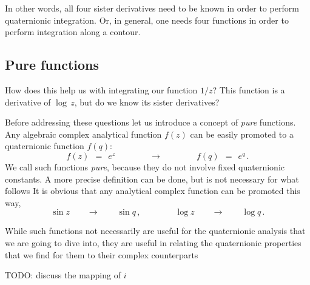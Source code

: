 \documentclass[epsfig,12pt]{article}
\begin{document}
	In other words, all four sister derivatives need to be known in order to perform quaternionic integration.
	Or, in general, one needs four functions in order to perform integration along a contour.


\subsection{Pure functions}

	How does this help us with integrating our function $ 1 / z $?
	This function is a derivative of $ \log\, z $, but do we know its sister derivatives?

	Before addressing these questions let us introduce a concept of \emph{pure} functions.
	Any algebraic complex analytical function $ f(z) $ can be easily promoted to a quaternionic function $ f(q) $:
\[
	f(z)	~~=~~	e^z		\qquad\qquad\longrightarrow\qquad\qquad		f(q)	~~=~~	e^q\,.
\]
	We call such functions \emph{pure}, because they do not involve fixed quaternionic constants.
	A more precise definition can be done, but is not necessary for what follows
	It is obvious that any analytical complex function can be promoted this way,
\[
	\sin z	\qquad\longrightarrow\qquad	\sin q\,,\qquad\qquad
	\log z \qquad\longrightarrow\qquad	\log q\,.
\]

	While such functions not necessarily are useful for the quaternionic analysis that we are going to dive into,
	they are useful in relating the quaternionic properties that we find for them to their complex counterparts


	TODO: discuss the mapping of $ i $

\newpage
\end{document}
